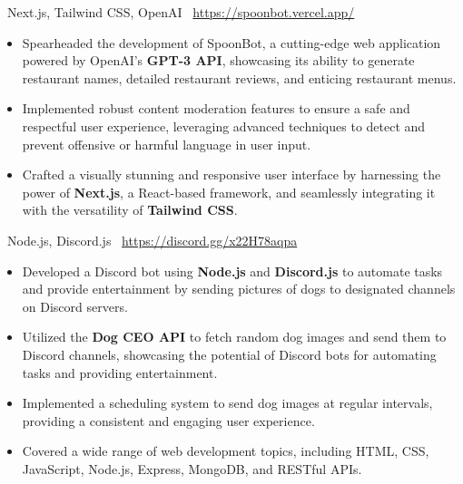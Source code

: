 \documentclass[9pt,a4paper,withhyper]{altacv}
\begin{document}
\begin{paracol}{2}
	\divider
			
	\vspace{-0.25em}
	{\small \faCode\,\,\,Next.js, Tailwind CSS, OpenAI}\newline
	{\small \faDesktop\,\,\,\url{https://spoonbot.vercel.app/}}
	\vspace{.50em}
	\begin{itemize}
		\item Spearheaded the development of SpoonBot, a cutting-edge web application powered by OpenAI's \textbf{GPT-3 API}, showcasing its ability to generate restaurant names, detailed restaurant reviews, and enticing restaurant menus.
		\item Implemented robust content moderation features to ensure a safe and respectful user experience, leveraging advanced techniques to detect and prevent offensive or harmful language in user input.
		\item Crafted a visually stunning and responsive user interface by harnessing the power of \textbf{Next.js}, a React-based framework, and seamlessly integrating it with the versatility of \textbf{Tailwind CSS}.
	\end{itemize}
	\divider
	\vspace{-0.25em}
	{\small \faCode\,\,\,Node.js, Discord.js}\newline
	{\small \faDesktop\,\,\,\url{https://discord.gg/x22H78aqpa}}
	\vspace{.50em}
	\begin{itemize}
		\item Developed a Discord bot using \textbf{Node.js} and \textbf{Discord.js} to automate tasks and provide entertainment by sending pictures of dogs to designated channels on Discord servers.
		\item Utilized the \textbf{Dog CEO API} to fetch random dog images and send them to Discord channels, showcasing the potential of Discord bots for automating tasks and providing entertainment.
		\item Implemented a scheduling system to send dog images at regular intervals, providing a consistent and engaging user experience.
	\end{itemize}
	\switchcolumn
			
			
	\begin{itemize}
		\item Covered a wide range of web development topics, including HTML, CSS, JavaScript, Node.js, Express, MongoDB, and RESTful APIs.
	\end{itemize}
	

\end{paracol}
\end{document}
